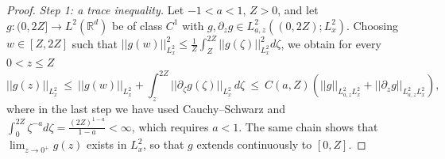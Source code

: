 \documentclass[11pt,letter]{amsart}
\newcommand{\Rd}{\mathbb R^d}
\newcommand{\p}{\partial}
\numberwithin{equation}{section}
\numberwithin{equation}{section}
\begin{document}
\begin{proof}
\smallskip
\noindent \emph{Step 1: a trace inequality.} Let $-1<a<1$, $Z>0$, and let $g:(0,2Z]\to L^2(\Rd)$ be of class $C^1$ with $g, \p_zg\in L^2_{a,z}((0,2Z);L^2_x)$. Choosing $w\in [Z,2Z]$ such that $||g(w)||^2_{L^2_x}\le \frac 1Z\int_Z^{2Z}||g(\zeta)||^2_{L^2_x}d\zeta$, we obtain for every $0<z\le Z$
\begin{equation}\label{tracez}
||g(z)||_{L^2_x}\ \le\ ||g(w)||_{L^2_x} + \int_z^{2Z}||\p_\zeta g(\zeta)||_{L^2_x}\, d\zeta\ \le\ C(a,Z)\left(||g||_{L^2_{a,z}L^2_x} + ||\p_zg||_{L^2_{a,z}L^2_x}\right),
\end{equation}
where in the last step we have used Cauchy--Schwarz and $\int_0^{2Z}\zeta^{-a}d\zeta = \frac{(2Z)^{1-a}}{1-a}<\infty$, which requires $a<1$. The same chain shows that $\lim_{z\to0^+}g(z)$ exists in $L^2_x$, so that $g$ extends continuously to $[0,Z]$.


\end{proof}
\end{document}
